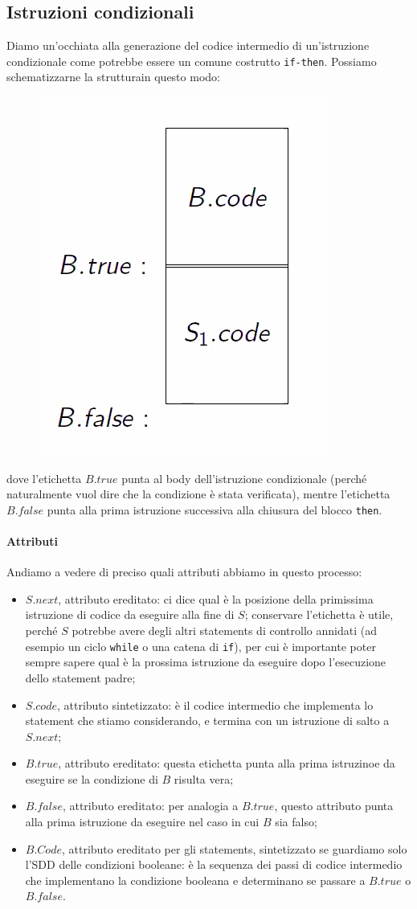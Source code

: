\documentclass[class=book, crop=false, oneside, 12pt]{standalone}
\begin{document}
\subsection{Istruzioni condizionali}
Diamo un'occhiata alla generazione del codice intermedio di un'istruzione condizionale come potrebbe essere un comune costrutto \texttt{if-then}. Possiamo schematizzarne la strutturain questo modo:
\begin{figure}[H]
    \centering
    \includegraphics[width=.3\textwidth]{if-then-abstract.png}
    \caption{}
    \label{}
\end{figure}
dove l'etichetta \(B.true\) punta al body dell'istruzione condizionale (perché naturalmente vuol dire che la condizione è stata verificata), mentre l'etichetta \(B.false\) punta alla prima istruzione successiva alla chiusura del blocco \texttt{then}.

\paragraph{Attributi}
Andiamo a vedere di preciso quali attributi abbiamo in questo processo:
\begin{itemize}
    \item \(S.next\), attributo ereditato: ci dice qual è la posizione della primissima istruzione di codice da eseguire alla fine di \(S\); conservare l'etichetta è utile, perché \(S\) potrebbe avere degli altri statements di controllo annidati (ad esempio un ciclo \texttt{while} o una catena di \texttt{if}), per cui è importante poter sempre sapere qual è la prossima istruzione da eseguire dopo l'esecuzione dello statement padre;
    \item \(S.code\), attributo sintetizzato: è il codice intermedio che implementa lo statement che stiamo considerando, e termina con un istruzione di salto a \(S.next\);
    \item \(B.true\), attributo ereditato: questa etichetta punta alla prima istruzinoe da eseguire se la condizione di \(B\) risulta vera;
    \item \(B.false\), attributo ereditato: per analogia a \(B.true\), questo attributo punta alla prima istruzione da eseguire nel caso in cui \(B\) sia falso;
    \item \(B.Code\), attributo ereditato per gli statements, sintetizzato se guardiamo solo l'SDD delle condizioni booleane: è la sequenza dei passi di codice intermedio che implementano la condizione booleana e determinano se passare a \(B.true\) o \(B.false\).
\end{itemize}
\end{document}
